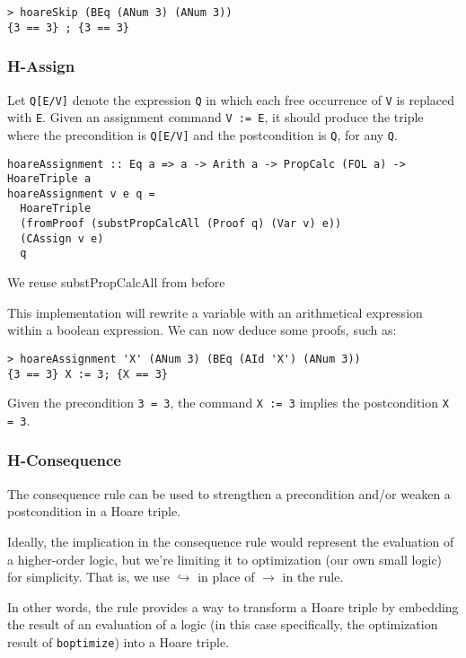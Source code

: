 \documentclass{article}
\begin{document}
\begin{lstlisting}
> hoareSkip (BEq (ANum 3) (ANum 3))
{3 == 3} ; {3 == 3}
\end{lstlisting}

\subsubsection{H-Assign}

Let \texttt{Q[E/V]} denote the expression \texttt{Q} in which each free occurrence of \texttt{V} is replaced with \texttt{E}. Given an assignment command \texttt{V := E}, it should produce the triple where the precondition is \texttt{Q[E/V]} and the postcondition is \texttt{Q}, for any \texttt{Q}.

\begin{lstlisting}
hoareAssignment :: Eq a => a -> Arith a -> PropCalc (FOL a) -> HoareTriple a
hoareAssignment v e q =
  HoareTriple
  (fromProof (substPropCalcAll (Proof q) (Var v) e))
  (CAssign v e)
  q
\end{lstlisting}

We reuse substPropCalcAll from before

This implementation will rewrite a variable with an arithmetical expression within a boolean expression. We can now deduce some proofs, such as:

\begin{lstlisting}
> hoareAssignment 'X' (ANum 3) (BEq (AId 'X') (ANum 3))
{3 == 3} X := 3; {X == 3}
\end{lstlisting}

Given the precondition \texttt{3 = 3}, the command \texttt{X := 3} implies the postcondition \texttt{X = 3}.

\subsubsection{H-Consequence}

The consequence rule can be used to strengthen a precondition and/or weaken a postcondition in a Hoare triple.

Ideally, the implication in the consequence rule would represent the evaluation of a higher-order logic, but we're limiting it to optimization (our own small logic) for simplicity. That is, we use $\hookrightarrow$ in place of $\to$ in the rule.

In other words, the rule provides a way to transform a Hoare triple by embedding the result of an evaluation of a logic (in this case specifically, the optimization result of \texttt{boptimize}) into a Hoare triple.
\end{document}
